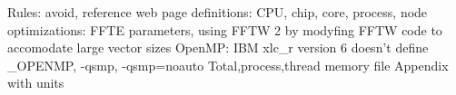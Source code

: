 Rules: avoid, reference web page
definitions: CPU, chip, core, process, node
optimizations: FFTE parameters, using FFTW 2 by modyfing FFTW code to
accomodate large vector sizes
OpenMP: IBM xlc_r version 6 doesn't define _OPENMP, -qsmp, -qsmp=noauto
Total,process,thread memory file
Appendix with units
